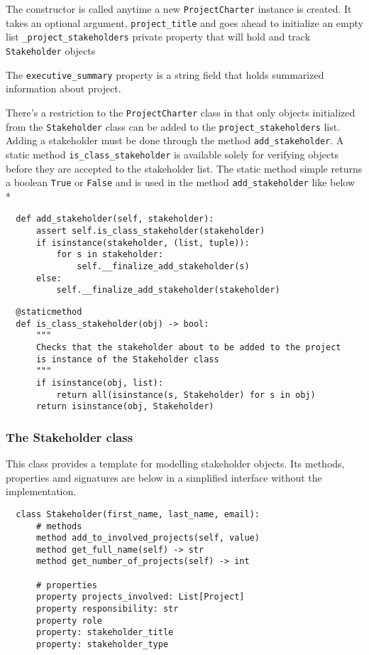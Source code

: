 The constructor is called anytime a new \verb+ProjectCharter+ instance is created. It takes an optional argument, \verb+project_title+ and goes ahead to initialize an empty list \verb+_project_stakeholders+ private property that will hold and track \verb+Stakeholder+ objects

The \verb+executive_summary+ property is a string field that holds summarized information about project.

There's a restriction to the \verb+ProjectCharter+ class in that only objects initialized from the \verb+Stakeholder+ class can be added to the \verb+project_stakeholders+ list. \linebreak Adding a stakeholder must be done through the method \verb+add_stakeholder+. A static method \verb+is_class_stakeholder+ is available solely for verifying objects before they are accepted to the stakeholder list. The static method simple returns a boolean \verb+True+ or \verb+False+ and is used in the method \verb+add_stakeholder+ like below\\*

\begin{lstlisting}
  def add_stakeholder(self, stakeholder):
      assert self.is_class_stakeholder(stakeholder)
      if isinstance(stakeholder, (list, tuple)):
          for s in stakeholder:
              self.__finalize_add_stakeholder(s)
      else:
          self.__finalize_add_stakeholder(stakeholder)
\end{lstlisting}

\vfill

\begin{lstlisting}
  @staticmethod
  def is_class_stakeholder(obj) -> bool:
      """
      Checks that the stakeholder about to be added to the project
      is instance of the Stakeholder class
      """
      if isinstance(obj, list):
          return all(isinstance(s, Stakeholder) for s in obj)
      return isinstance(obj, Stakeholder)
\end{lstlisting}


\subsubsection{The Stakeholder class}
This class provides a template for modelling stakeholder objects. Its methods, properties amd signatures are below in a simplified interface without the implementation.

\begin{lstlisting}
  class Stakeholder(first_name, last_name, email):
      # methods
      method add_to_involved_projects(self, value)
      method get_full_name(self) -> str
      method get_number_of_projects(self) -> int

      # properties
      property projects_involved: List[Project]
      property responsibility: str
      property role
      property: stakeholder_title
      property: stakeholder_type
\end{lstlisting}

